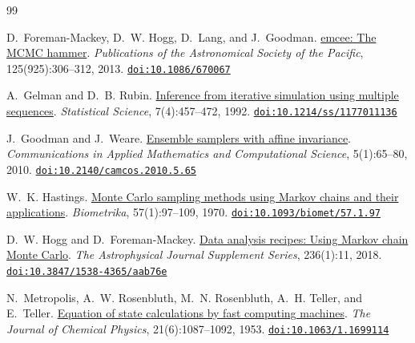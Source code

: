 
\cleardoublepage
{}
{}
\markboth{\bibname}{}
\begin{thebibliography}{99}
\setlength{\itemsep}{3pt}
\newcommand{\doilink}[1]{\newblock \href{https://doi.org/#1}{\nolinkurl{doi:#1}}}
\newcommand{\urllink}[1]{\newblock \url{#1}}

D.~Foreman-Mackey, D.~W. Hogg, D.~Lang, and J.~Goodman.
\newblock \href{https://doi.org/10.1086/670067}{emcee: The MCMC hammer}.
\newblock \emph{Publications of the Astronomical Society of the Pacific}, 125(925):306--312, 2013.
\doilink{10.1086/670067}

A.~Gelman and D.~B. Rubin.
\newblock \href{https://doi.org/10.1214/ss/1177011136}{Inference from iterative simulation using
  multiple sequences}.
\newblock \emph{Statistical Science}, 7(4):457--472, 1992.
\doilink{10.1214/ss/1177011136}

J.~Goodman and J.~Weare.
\newblock \href{https://doi.org/10.2140/camcos.2010.5.65}{Ensemble samplers with affine invariance}.
\newblock \emph{Communications in Applied Mathematics and Computational Science}, 5(1):65--80, 2010.
\doilink{10.2140/camcos.2010.5.65}

W.~K. Hastings.
\newblock \href{https://doi.org/10.1093/biomet/57.1.97}{Monte Carlo sampling methods using Markov
  chains and their applications}.
\newblock \emph{Biometrika}, 57(1):97--109, 1970.
\doilink{10.1093/biomet/57.1.97}

D.~W. Hogg and D.~Foreman-Mackey.
\newblock \href{https://doi.org/10.3847/1538-4365/aab76e}{Data analysis recipes: Using Markov chain
  Monte Carlo}.
\newblock \emph{The Astrophysical Journal Supplement Series}, 236(1):11, 2018.
\doilink{10.3847/1538-4365/aab76e}

N.~Metropolis, A.~W. Rosenbluth, M.~N. Rosenbluth, A.~H. Teller, and E.~Teller.
\newblock \href{https://doi.org/10.1063/1.1699114}{Equation of state calculations by fast computing
  machines}.
\newblock \emph{The Journal of Chemical Physics}, 21(6):1087--1092, 1953.
\doilink{10.1063/1.1699114}


\end{thebibliography}
